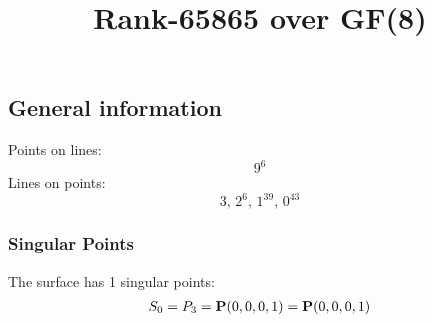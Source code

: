 \documentclass{article}
\newcommand\setTBstruts{\def\T{\rule{0pt}{2.6ex}}%
\def\B{\rule[-1.2ex]{0pt}{0pt}}}
\newcommand{\bP}{{\bf P}}
\begin{document}
 
\setTBstruts



{\allowdisplaybreaks%






\title{Rank-65865 over GF(8)}
\author{}%
\maketitle%
%
{}



\subsection*{General information}
Points on lines:
$$
9^6$$
Lines on points:
$$
3,\,2^6,\,1^{39},\,0^{43}$$
\subsubsection*{Singular Points}
The surface has 1 singular points:\\
\begin{align*}
S_{0} &= P_{3}=\bP(0, 0, 0, 1) = \bP(0, 0, 0, 1)\\
\end{align*}
}
\end{document}
